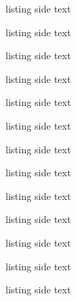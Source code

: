 \documentclass[11pt,a4paper]{ltxdoc}
\begin{document}
\begin{tcblisting}{listing side text}
\samplevectorlogo{\logogeogebra}
\end{tcblisting}

\begin{tcblisting}{listing side text}
\samplevectorlogo{\logogeogebra[icon]}
\end{tcblisting}

\begin{tcblisting}{listing side text}
\samplevectorlogo{\logoscratch}
\end{tcblisting}

\begin{tcblisting}{listing side text}
\samplevectorlogo{\logoscratch[alt]}
\end{tcblisting}

\begin{tcblisting}{listing side text}
\samplevectorlogo{\logoscratch[cat]}
\end{tcblisting}

\begin{tcblisting}{listing side text}
\samplevectorlogo{\logotexstudio}
\end{tcblisting}

\begin{tcblisting}{listing side text}
\samplevectorlogo{\logoemacs}
\end{tcblisting}

\begin{tcblisting}{listing side text}
\samplevectorlogo{\logoemacs[alt]}
\end{tcblisting}

\begin{tcblisting}{listing side text}
\samplevectorlogo{\logotexmaker}
\end{tcblisting}

\begin{tcblisting}{listing side text}
\samplevectorlogo{\logotexmaker[alt]}
\end{tcblisting}

\begin{tcblisting}{listing side text}
\samplevectorlogo{\logomiktex}
\end{tcblisting}

\begin{tcblisting}{listing side text}
\samplevectorlogo{\logomiktex[icon]}
\end{tcblisting}

\begin{tcblisting}{listing side text}
\end{tcblisting}
\end{document}
